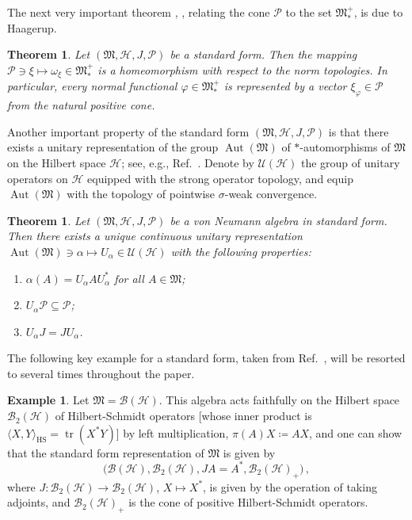 \documentclass[a4paper, twoside, 11pt, reqno]{amsart}
\theoremstyle{definition}
\newtheorem{example}[definition]{Example}
\theoremstyle{plain}
\newtheorem{theorem}[definition]{Theorem}
\renewcommand{\subset}{\subseteq}
\newcommand{\MH}{\mathcal{H}}
\newcommand{\MFM}{\mathfrak{M}}
\newcommand{\BO}{\mathscr{B}}
\newcommand{\HS}{\BO_2}
\newcommand{\UO}{\mathscr{U}}
\newcommand{\NF}[1]{#1_{\ast}^{+}}
\newcommand{\NPC}{\mathcal{P}}
\newcommand{\1}{\mathbf{1}}
\DeclareMathOperator{\Aut}{Aut}
\DeclareMathOperator{\tr}{tr}
\newcommand{\braket}[2][]{#1\langle{#2}#1\rangle}
\newcommand{\ce}{\coloneqq}
\begin{document}
The next very important theorem \cite[Thm. 3.12]{Hiai2021}, \cite[Thm. 10.25]{StratilaZsido2019}, relating the cone $\NPC$ to the set $\NF{\MFM}$, is due to Haagerup.

\begin{theorem}\label{thm:vectorRepresentation}
    Let $(\MFM, \MH, J, \NPC)$ be a standard form. Then the mapping $\NPC \owns \xi \mapsto \omega_\xi \in \NF{\MFM}$ is a homeomorphism with respect to the norm topologies. In particular, every normal functional $\varphi \in \NF{\MFM}$ is represented by a vector $\xi_\varphi \in \NPC$ from the natural positive cone.
\end{theorem}

Another important property of the standard form $(\MFM, \MH, J, \NPC)$ is that there exists a unitary representation of the group $\Aut(\MFM)$ of $\ast$-automorphisms of $\MFM$ on the Hilbert space $\MH$; see, e.g., Ref.~\cite[Cor. 2.5.32]{BR1}. Denote by $\UO(\MH)$ the group of unitary operators on $\MH$ equipped with the strong operator topology, and equip $\Aut(\MFM)$ with the topology of pointwise $\sigma$-weak convergence.

\begin{theorem}\label{thm:unitaryReprAut}
    Let $(\MFM, \MH, J, \NPC)$ be a von Neumann algebra in standard form. Then there exists a unique continuous unitary representation $\Aut(\MFM) \owns \alpha \mapsto U_\alpha \in \UO(\MH)$ with the following properties:
    \begin{enumerate}
        \item $\alpha(A) = U_\alpha A U_\alpha^\ast$ for all $A \in \MFM$;
        \item $U_\alpha \NPC \subset \NPC$;
        \item $U_\alpha J = J U_\alpha$.
    \end{enumerate}
\end{theorem}

The following key example for a standard form, taken from Ref.~\cite[Exa. 3.6 (2)]{Hiai2021}, will be resorted to several times throughout the paper.

\begin{example}\label{exa:standardForm}
    Let $\MFM = \BO(\MH)$. This algebra acts faithfully on the Hilbert space $\HS(\MH)$ of Hilbert-Schmidt operators [whose inner product is $\braket{X, Y}_\mathrm{HS} = \tr(X^\ast Y)$] by left multiplication, $\pi(A) X \ce A X$, and one can show that the standard form representation of $\MFM$ is given by
    \begin{equation*}
        \bigl(\BO(\MH), \HS(\MH), J A = A^\ast, \HS(\MH)_+\bigr) \, ,
    \end{equation*}
    where $J : \HS(\MH) \to \HS(\MH)$, $X \mapsto X^\ast$, is given by the operation of taking adjoints, and $\HS(\MH)_+$ is the cone of positive Hilbert-Schmidt operators.
\end{example}
\end{document}
